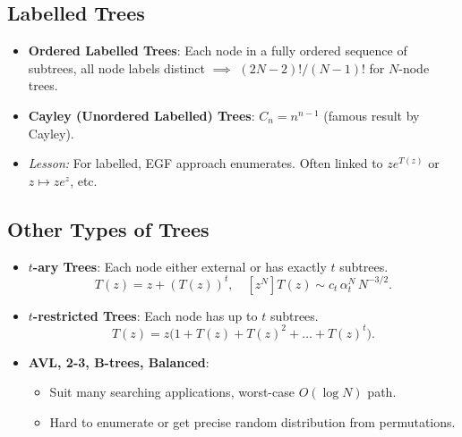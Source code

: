 \documentclass[11pt,letterpaper]{article}
\begin{document}
\subsection{Labelled Trees}
\begin{itemize}
  \item \textbf{Ordered Labelled Trees}: Each node in a fully ordered sequence of subtrees, all node labels distinct $\implies$ $(2N-2)!/(N-1)!$ for $N$-node trees.
  \item \textbf{Cayley (Unordered Labelled) Trees}: $\displaystyle C_n = n^{n-1}$ (famous result by Cayley).
  \item \emph{Lesson:} For labelled, EGF approach enumerates. Often linked to $ze^{T(z)}$ or $z\mapsto ze^z$, etc.
\end{itemize}

\subsection{Other Types of Trees}
\begin{itemize}
  \item \textbf{$t$-ary Trees}: Each node either external or has exactly $t$ subtrees.
    \[
      T(z)=z+(T(z))^t, \quad
      [z^N]T(z)\sim c_t\,\alpha_t^N\,N^{-3/2}.
    \]
  \item \textbf{$t$-restricted Trees}: Each node has up to $t$ subtrees.
    \[
      T(z)=z\bigl(1+T(z)+T(z)^2+\dots+T(z)^t\bigr).
    \]
  \item \textbf{AVL, 2-3, B-trees, Balanced}:
    \begin{itemize}
      \item Suit many searching applications, worst-case $O(\log N)$ path.
      \item Hard to enumerate or get precise random distribution from permutations.
    \end{itemize}
\end{itemize}

\end{document}
